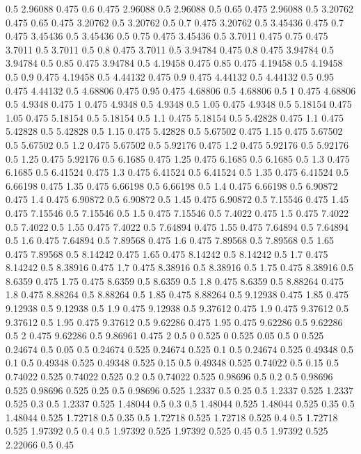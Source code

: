 0.5 2.96088
0.475 0.6
0.475 2.96088
0.5 2.96088
0.5 0.65
0.475 2.96088
0.5 3.20762
0.475 0.65
0.475 3.20762
0.5 3.20762
0.5 0.7
0.475 3.20762
0.5 3.45436
0.475 0.7
0.475 3.45436
0.5 3.45436
0.5 0.75
0.475 3.45436
0.5 3.7011
0.475 0.75
0.475 3.7011
0.5 3.7011
0.5 0.8
0.475 3.7011
0.5 3.94784
0.475 0.8
0.475 3.94784
0.5 3.94784
0.5 0.85
0.475 3.94784
0.5 4.19458
0.475 0.85
0.475 4.19458
0.5 4.19458
0.5 0.9
0.475 4.19458
0.5 4.44132
0.475 0.9
0.475 4.44132
0.5 4.44132
0.5 0.95
0.475 4.44132
0.5 4.68806
0.475 0.95
0.475 4.68806
0.5 4.68806
0.5 1
0.475 4.68806
0.5 4.9348
0.475 1
0.475 4.9348
0.5 4.9348
0.5 1.05
0.475 4.9348
0.5 5.18154
0.475 1.05
0.475 5.18154
0.5 5.18154
0.5 1.1
0.475 5.18154
0.5 5.42828
0.475 1.1
0.475 5.42828
0.5 5.42828
0.5 1.15
0.475 5.42828
0.5 5.67502
0.475 1.15
0.475 5.67502
0.5 5.67502
0.5 1.2
0.475 5.67502
0.5 5.92176
0.475 1.2
0.475 5.92176
0.5 5.92176
0.5 1.25
0.475 5.92176
0.5 6.1685
0.475 1.25
0.475 6.1685
0.5 6.1685
0.5 1.3
0.475 6.1685
0.5 6.41524
0.475 1.3
0.475 6.41524
0.5 6.41524
0.5 1.35
0.475 6.41524
0.5 6.66198
0.475 1.35
0.475 6.66198
0.5 6.66198
0.5 1.4
0.475 6.66198
0.5 6.90872
0.475 1.4
0.475 6.90872
0.5 6.90872
0.5 1.45
0.475 6.90872
0.5 7.15546
0.475 1.45
0.475 7.15546
0.5 7.15546
0.5 1.5
0.475 7.15546
0.5 7.4022
0.475 1.5
0.475 7.4022
0.5 7.4022
0.5 1.55
0.475 7.4022
0.5 7.64894
0.475 1.55
0.475 7.64894
0.5 7.64894
0.5 1.6
0.475 7.64894
0.5 7.89568
0.475 1.6
0.475 7.89568
0.5 7.89568
0.5 1.65
0.475 7.89568
0.5 8.14242
0.475 1.65
0.475 8.14242
0.5 8.14242
0.5 1.7
0.475 8.14242
0.5 8.38916
0.475 1.7
0.475 8.38916
0.5 8.38916
0.5 1.75
0.475 8.38916
0.5 8.6359
0.475 1.75
0.475 8.6359
0.5 8.6359
0.5 1.8
0.475 8.6359
0.5 8.88264
0.475 1.8
0.475 8.88264
0.5 8.88264
0.5 1.85
0.475 8.88264
0.5 9.12938
0.475 1.85
0.475 9.12938
0.5 9.12938
0.5 1.9
0.475 9.12938
0.5 9.37612
0.475 1.9
0.475 9.37612
0.5 9.37612
0.5 1.95
0.475 9.37612
0.5 9.62286
0.475 1.95
0.475 9.62286
0.5 9.62286
0.5 2
0.475 9.62286
0.5 9.86961
0.475 2
0.5 0
0.525 0
0.525 0.05
0.5 0
0.525 0.24674
0.5 0.05
0.5 0.24674
0.525 0.24674
0.525 0.1
0.5 0.24674
0.525 0.49348
0.5 0.1
0.5 0.49348
0.525 0.49348
0.525 0.15
0.5 0.49348
0.525 0.74022
0.5 0.15
0.5 0.74022
0.525 0.74022
0.525 0.2
0.5 0.74022
0.525 0.98696
0.5 0.2
0.5 0.98696
0.525 0.98696
0.525 0.25
0.5 0.98696
0.525 1.2337
0.5 0.25
0.5 1.2337
0.525 1.2337
0.525 0.3
0.5 1.2337
0.525 1.48044
0.5 0.3
0.5 1.48044
0.525 1.48044
0.525 0.35
0.5 1.48044
0.525 1.72718
0.5 0.35
0.5 1.72718
0.525 1.72718
0.525 0.4
0.5 1.72718
0.525 1.97392
0.5 0.4
0.5 1.97392
0.525 1.97392
0.525 0.45
0.5 1.97392
0.525 2.22066
0.5 0.45
